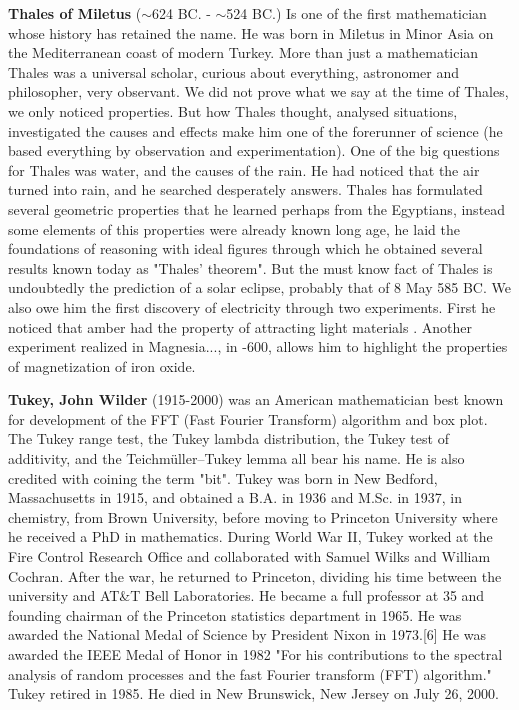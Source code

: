 \textbf{Thales of Miletus } ($\sim$624 BC. - $\sim$524 BC.) Is one of the first mathematician whose history has retained the name. He was born in Miletus in Minor Asia on the Mediterranean coast of modern Turkey. More than just a mathematician Thales was a universal scholar, curious about everything, astronomer and philosopher, very observant. We did not prove what we say at the time of Thales, we only noticed properties. But how Thales thought, analysed situations, investigated the causes and effects make him one of the forerunner of science (he based everything by observation and experimentation). One of the big questions for Thales was water, and the causes of the rain. He had noticed that the air turned into rain, and he searched desperately answers. Thales has formulated several geometric properties that he learned perhaps from the Egyptians, instead some elements of this properties were already known long age, he laid the foundations of reasoning with ideal figures through which he obtained several results known today as "Thales' theorem". But the must know fact of Thales is undoubtedly the prediction of a solar eclipse, probably that of 8 May 585 BC. We also owe him the first discovery of electricity through two experiments. First he noticed that amber had the property of attracting light materials . Another experiment realized in Magnesia..., in -600, allows him to highlight the properties of magnetization of iron oxide.

\textbf{Tukey, John Wilder} (1915-2000) was an American mathematician best known for development of the FFT (Fast Fourier Transform) algorithm and box plot. The Tukey range test, the Tukey lambda distribution, the Tukey test of additivity, and the Teichmüller–Tukey lemma all bear his name. He is also credited with coining the term "bit". Tukey was born in New Bedford, Massachusetts in 1915, and obtained a B.A. in 1936 and M.Sc. in 1937, in chemistry, from Brown University, before moving to Princeton University where he received a PhD in mathematics. During World War II, Tukey worked at the Fire Control Research Office and collaborated with Samuel Wilks and William Cochran. After the war, he returned to Princeton, dividing his time between the university and AT\&T Bell Laboratories. He became a full professor at 35 and founding chairman of the Princeton statistics department in 1965. He was awarded the National Medal of Science by President Nixon in 1973.[6] He was awarded the IEEE Medal of Honor in 1982 "For his contributions to the spectral analysis of random processes and the fast Fourier transform (FFT) algorithm." Tukey retired in 1985. He died in New Brunswick, New Jersey on July 26, 2000.

